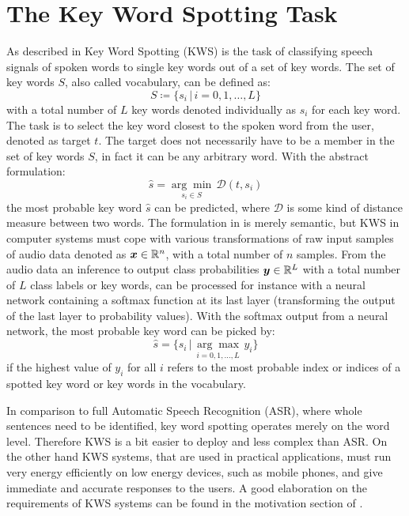 
\section{The Key Word Spotting Task}\label{sec:intro_kws}
\thesisStateRevised
As described in  Key Word Spotting (KWS) is the task of classifying speech signals of spoken words to single key words out of a set of key words.
The set of key words $S$, also called vocabulary, can be defined as:
\begin{equation}\label{eq:intro_kws_dict}
	S \coloneqq \{s_i \, | \, i = 0, 1, \dots, L\}
\end{equation}
with a total number of $L$ key words denoted individually as $s_i$ for each key word.
The task is to select the key word closest to the spoken word from the user, denoted as target $t$.
The target does not necessarily have to be a member in the set of key words $S$, in fact it can be any arbitrary word.
With the abstract formulation:
\begin{equation}\label{eq:intro_kws_task}
	\hat{s} = \underset{s_i \in S}{\arg \min} \, \mathcal{D}(t, s_i)
\end{equation}
the most probable key word $\hat{s}$ can be predicted, where $\mathcal{D}$ is some kind of distance measure between two words.
The formulation in  is merely semantic, but KWS in computer systems must cope with various transformations of raw input samples of audio data denoted as $\bm{x} \in \mathbb{R}^n$, with a total number of $n$ samples.
From the audio data an inference to output class probabilities $\bm{y} \in \mathbb{R}^L$ with a total number of $L$ class labels or key words, can be processed for instance with a neural network containing a softmax function at its last layer (transforming the output of the last layer to probability values).
With the softmax output from a neural network, the most probable key word can be picked by:
\begin{equation}\label{eq:intro_kws_class}
	\hat{s} = \{s_i \, | \, \underset{i = 0, 1, \dots, L}{\arg \max} \, y_i\}
\end{equation}
if the highest value of $y_i$ for all $i$ refers to the most probable index or indices of a spotted key word or key words in the vocabulary.

In comparison to full Automatic Speech Recognition (ASR), where whole sentences need to be identified, key word spotting operates merely on the word level.
Therefore KWS is a bit easier to deploy and less complex than ASR.
On the other hand KWS systems, that are used in practical applications, must run very energy efficiently on low energy devices, such as mobile phones, and give immediate and accurate responses to the users. 
A good elaboration on the requirements of KWS systems can be found in the motivation section of \cite{Warden2018}.